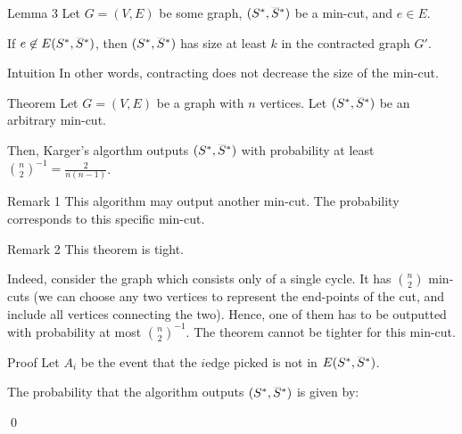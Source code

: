 \documentclass[a4paper]{article}
\begin{document}
\begin{parag}{Lemma 3}
    Let $G = \left(V, E\right)$ be some graph, $\left(S^*, \smash{\bar{S}}^*\right)$ be a min-cut, and $e \in E$.

    If $e \not \in E\left(S^*, \smash{\bar{S}}^*\right)$, then $\left(S^*, \smash{\bar{S}}^*\right)$ has size at least $k$ in the contracted graph $G'$.
    
    \begin{subparag}{Intuition}
        In other words, contracting does not decrease the size of the min-cut.
    \end{subparag}
\end{parag}

\begin{parag}{Theorem}
    Let $G = \left(V, E\right)$ be a graph with $n$ vertices. Let $\left(S^*, \smash{\bar{S}}^*\right)$ be an arbitrary min-cut.

    Then, Karger's algorthm outputs $\left(S^*, \smash{\bar{S}}^*\right)$ with probability at least $\binom{n}{2}^{-1} = \frac{2}{n\left(n-1\right)}$.

    \begin{subparag}{Remark 1}
        This algorithm may output another min-cut. The probability corresponds to this specific min-cut.
    \end{subparag}

    \begin{subparag}{Remark 2}
        This theorem is tight.

        Indeed, consider the graph which consists only of a single cycle. It has $\binom{n}{2}$ min-cuts (we can choose any two vertices to represent the end-points of the cut, and include all vertices connecting the two). Hence, one of them has to be outputted with probability at most $\binom{n}{2}^{-1}$. The theorem cannot be tighter for this min-cut.
    \end{subparag}

    \begin{subparag}{Proof}
        Let $A_i$ be the event that the $i$\Th edge picked is not in $E\left(S^*, \smash{\bar{S}}^*\right)$.

        The probability that the algorithm outputs $\left(S^*, \smash{\bar{S}}^*\right)$ is given by: 

        \qed
    \end{subparag}
\end{parag}
\end{document}
